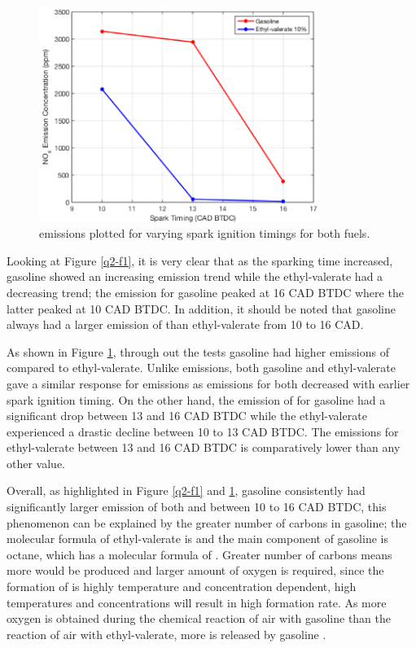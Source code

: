 \documentclass[11pt]{article}
\begin{document}
\begin{figure}[H]
    \centering
    \includegraphics[height = 7cm]{./img/diagram5.png}
    \caption{ emissions plotted for varying spark ignition timings for both fuels.}
    \label{q2-f2}
\end{figure}
Looking at Figure \ref{q2-f1}, it is very clear that as the sparking time increased, gasoline showed an increasing  emission trend while the ethyl-valerate had a decreasing trend; the  emission for gasoline peaked at 16 CAD BTDC where the latter peaked at 10 CAD BTDC. In addition, it should be noted that gasoline always had a larger emission of  than ethyl-valerate from 10 to 16 CAD. 

As shown in Figure \ref{q2-f2}, through out the tests gasoline had higher emissions of  compared to ethyl-valerate. Unlike  emissions, both gasoline and ethyl-valerate gave a similar response for  emissions as emissions for both decreased with earlier spark ignition timing. On the other hand, the emission of  for gasoline had a significant drop between 13 and 16 CAD BTDC while the ethyl-valerate experienced a drastic decline between 10 to 13 CAD BTDC. The  emissions for ethyl-valerate between 13 and 16 CAD BTDC is comparatively lower than any other value. 

Overall, as highlighted in Figure \ref{q2-f1} and \ref{q2-f2}, gasoline consistently had significantly larger emission of both  and   between 10 to 16 CAD BTDC, this phenomenon can be explained by the greater number of carbons in gasoline; the molecular formula of ethyl-valerate is  \cite{q2-r1} and the main component of gasoline is octane, which has a molecular formula of  \cite{q2-r2}. Greater number of carbons means more  would be produced and larger amount of oxygen is required, since the formation of  is highly temperature and  concentration dependent, high temperatures and  concentrations will result in high  formation rate. As more oxygen is obtained during the chemical reaction of air with gasoline than the reaction of air with ethyl-valerate, more  is released by gasoline \cite{q2-r3}.
\end{document}
